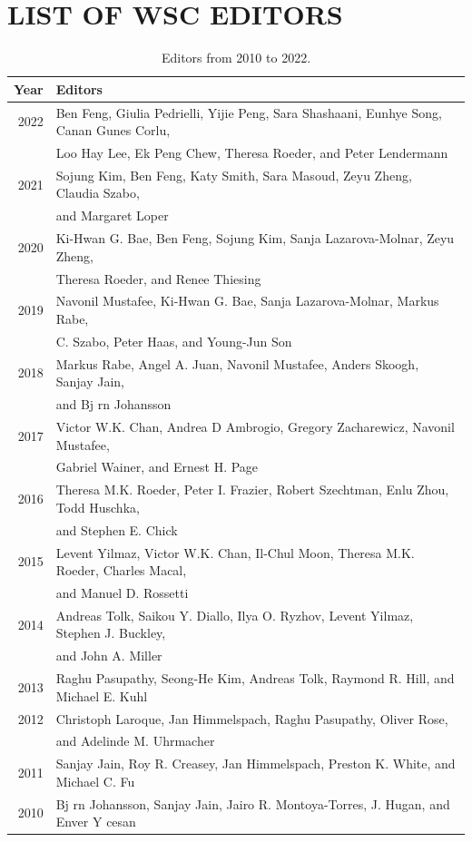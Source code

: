 \documentclass{article}
\begin{document}
\section*{LIST OF WSC EDITORS}
\begin{table}[htb]
\centering
\caption{Editors from 2010 to 2022.\label{tab: third}}
\begin{tabular}{|r|l|}
\hline
Year & Editors\\ \hline
2022 & Ben Feng, Giulia Pedrielli, Yijie Peng, Sara Shashaani, Eunhye Song, Canan Gunes Corlu,\\&Loo Hay Lee, Ek Peng Chew, Theresa Roeder, and Peter Lendermann\\ \hline
2021 & Sojung Kim, Ben Feng, Katy Smith, Sara Masoud, Zeyu Zheng, Claudia Szabo,\\
& and Margaret Loper\\ \hline
2020 & Ki-Hwan G. Bae, Ben Feng, Sojung Kim, Sanja Lazarova-Molnar, Zeyu Zheng,\\ 
 & Theresa Roeder, and Renee Thiesing\\ \hline
2019 & Navonil Mustafee, Ki-Hwan G. Bae, Sanja Lazarova-Molnar, Markus Rabe, \\ 
 & C. Szabo, Peter Haas, and Young-Jun Son\\ \hline
2018 & Markus Rabe, Angel A. Juan, Navonil Mustafee, Anders Skoogh, Sanjay Jain,\\
 & and Bj rn Johansson\\ \hline
2017 & Victor W.K. Chan, Andrea D Ambrogio, Gregory Zacharewicz, Navonil Mustafee,\\
 & Gabriel Wainer, and Ernest H. Page\\ \hline
2016 & Theresa M.K. Roeder, Peter I. Frazier, Robert Szechtman, Enlu Zhou, Todd Huschka,\\
 & and Stephen E. Chick\\ \hline
2015 & Levent Yilmaz, Victor W.K. Chan, Il-Chul Moon, Theresa M.K. Roeder, Charles Macal, \\
 & and Manuel D. Rossetti\\ \hline
2014 & Andreas Tolk, Saikou Y. Diallo, Ilya O. Ryzhov, Levent Yilmaz, Stephen J. Buckley, \\
 & and John A. Miller\\ \hline
2013 & Raghu Pasupathy, Seong-He Kim, Andreas Tolk, Raymond R. Hill, and Michael E. Kuhl\\ \hline
2012 & Christoph Laroque, Jan Himmelspach, Raghu Pasupathy, Oliver Rose, \\
 & and Adelinde M. Uhrmacher\\ \hline
2011 & Sanjay Jain, Roy R. Creasey, Jan Himmelspach, Preston K. White, and Michael C. Fu\\ \hline
2010 & Bj rn Johansson, Sanjay Jain, Jairo R. Montoya-Torres, J. Hugan, and Enver Y cesan\\
\hline
\end{tabular}
\end{table}
\end{document}
